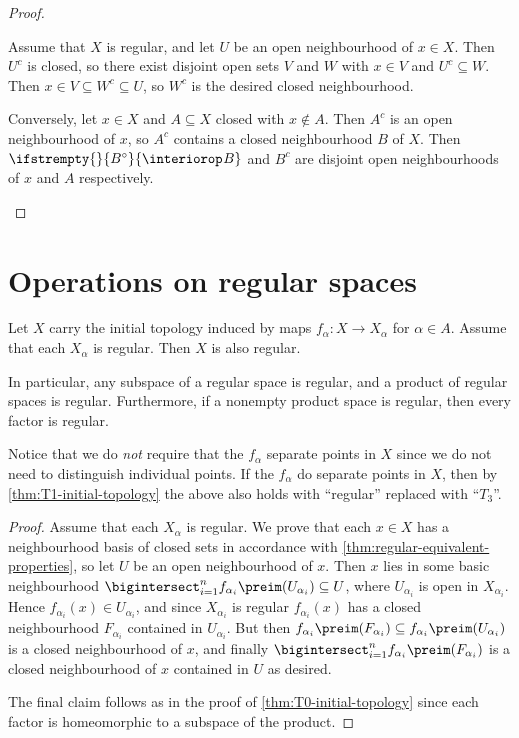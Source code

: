 \documentclass[article, a4paper, 11pt, oneside]{memoir}
\numberwithin{equation}{chapter}
\renewcommand\interior[2][]{%
    \ifstrempty{#1}{%
        #2^{\circ}
    }{%
        \interiorop_{#1}#2
    }%
}
\begin{document}
\begin{proof}
\begin{proofsec}
    Assume that $X$ is regular, and let $U$ be an open neighbourhood of $x \in X$. Then $U^c$ is closed, so there exist disjoint open sets $V$ and $W$ with $x \in V$ and $U^c \subseteq W$. Then $x \in V \subseteq W^c \subseteq U$, so $W^c$ is the desired closed neighbourhood.

    Conversely, let $x \in X$ and $A \subseteq X$ closed with $x \not\in A$. Then $A^c$ is an open neighbourhood of $x$, so $A^c$ contains a closed neighbourhood $B$ of $X$. Then $\interior{B}$ and $B^c$ are disjoint open neighbourhoods of $x$ and $A$ respectively.
\end{proofsec}
\end{proof}


\section{Operations on regular spaces}

\begin{proposition}
    \label{thm:regular-initial-topology}
    Let $X$ carry the initial topology induced by maps $f_\alpha \colon X \to X_\alpha$ for $\alpha \in A$. Assume that each $X_\alpha$ is regular. Then $X$ is also regular.

    In particular, any subspace of a regular space is regular, and a product of regular spaces is regular. Furthermore, if a nonempty product space is regular, then every factor is regular.
\end{proposition}
%
Notice that we do \emph{not} require that the $f_\alpha$ separate points in $X$ since we do not need to distinguish individual points. If the $f_\alpha$ do separate points in $X$, then by \cref{thm:T1-initial-topology} the above also holds with \enquote{regular} replaced with \enquote{$T_3$}.

\begin{proof}
    Assume that each $X_\alpha$ is regular. We prove that each $x \in X$ has a neighbourhood basis of closed sets in accordance with \cref{thm:regular-equivalent-properties}, so let $U$ be an open neighbourhood of $x$. Then $x$ lies in some basic neighbourhood $\bigintersect_{i=1}^n f_{\alpha_i}\preim(U_{\alpha_i}) \subseteq U$, where $U_{\alpha_i}$ is open in $X_{\alpha_i}$. Hence $f_{\alpha_i}(x) \in U_{\alpha_i}$, and since $X_{\alpha_i}$ is regular $f_{\alpha_i}(x)$ has a closed neighbourhood $F_{\alpha_i}$ contained in $U_{\alpha_i}$. But then $f_{\alpha_i}\preim(F_{\alpha_i}) \subseteq f_{\alpha_i}\preim(U_{\alpha_i})$ is a closed neighbourhood of $x$, and finally $\bigintersect_{i=1}^n f_{\alpha_i}\preim(F_{\alpha_i})$ is a closed neighbourhood of $x$ contained in $U$ as desired.

    The final claim follows as in the proof of \cref{thm:T0-initial-topology} since each factor is homeomorphic to a subspace of the product.
\end{proof}
\end{document}
